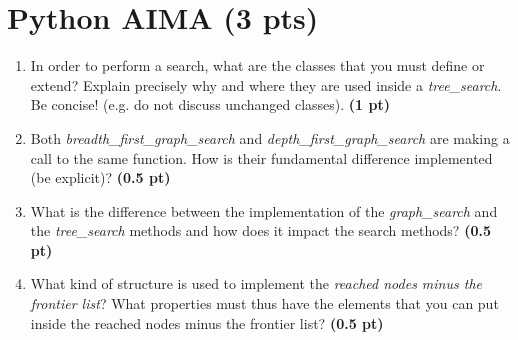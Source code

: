 \documentclass[11pt,a4paper]{../template/report}
\begin{document}
\maketitle

\section{Python AIMA (3 pts)}

\begin{enumerate}
  \item In order to perform a search, what are the classes that you must define or extend? Explain precisely why and where they are used inside a \textit{tree\_search}. Be concise! (e.g. do not discuss unchanged classes). \textbf{(1 pt)}
\end{enumerate}

\begin{answer}
\end{answer}



\begin{enumerate}
\setcounter{enumi}{1}
    \item Both \textit{breadth\_first\_graph\_search} and \textit{depth\_first\_graph\_search} are making a call to the same function. How is their fundamental difference implemented (be explicit)? \textbf{(0.5 pt)}
\end{enumerate}

\begin{answer}
\end{answer}



\begin{enumerate}
\setcounter{enumi}{2}
    \item What is the difference between the implementation of the \textit{graph\_search} and the \textit{tree\_search} methods and how does it impact the search methods? \textbf{(0.5 pt)}
\end{enumerate}

\begin{answer}
\end{answer}



\begin{enumerate}
\setcounter{enumi}{3}
    \item What kind of structure is used to implement the \textit{reached nodes minus the frontier list}? What properties must thus have the elements that you can
	put inside the reached nodes minus the frontier list? \textbf{(0.5 pt)}
\end{enumerate}
\end{document}
